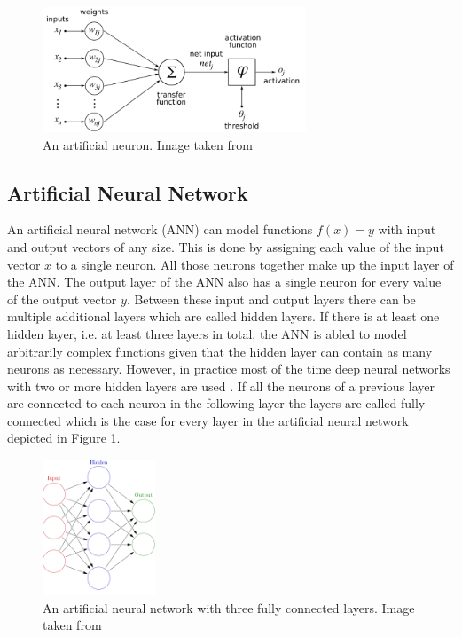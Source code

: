 \begin{figure}[h]
    \centering
    \includegraphics[width=0.7\textwidth]{images/figures/artificial_neuronHOML.png}
    \caption{An artificial neuron. Image taken from \parencite{2005-chrislb-artificial-neuron}}
\end{figure}


\subsection{Artificial Neural Network}

An artificial neural network (ANN) can model functions $f(x) = y$ with input and output vectors of any size.
This is done by assigning each value of the input vector $x$ to a single neuron. All those neurons together make
up the input layer of the ANN. The output layer of the ANN also has a single neuron for every value of the
output vector $y$. Between these input and output layers there can be multiple additional layers which are called
hidden layers. If there is at least one hidden layer, i.e. at least three layers in total, the ANN is abled to 
model arbitrarily complex functions given that the hidden layer can contain as many neurons as necessary.
However, in practice most of the time
deep neural networks with two or more hidden layers are used \parencite{2017-geron-homl}.
If all the neurons of a previous layer are connected to each neuron in the following layer the layers are
called fully connected which is the case for every layer in the artificial neural network depicted
in Figure \ref{figure_fully_connected_nn}.

\begin{figure}[ht] 
    \centering
    \includegraphics[width=0.3\textwidth]{images/figures/artificial_neural_network.png}
    \caption{An artificial neural network with three fully connected layers.
    Image taken from \parencite{2013-glosser-ann}} \label{figure_fully_connected_nn}
\end{figure} 

